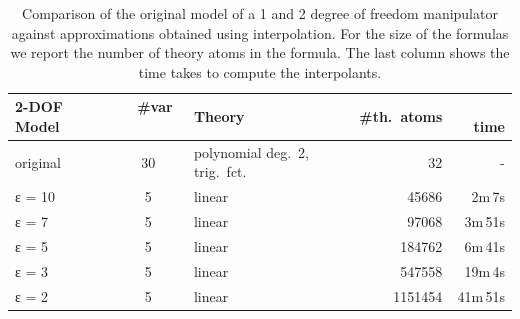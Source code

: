 \begin{example}
\begin{table}
\vspace{2ex}

\begin{tabular}{l|clrr}
2-DOF Model    & ~ \#var  ~~ & Theory   & \#th.~atoms & ~~ time \\
\hline
original & 30 & polynomial deg.~2, trig.~fct.   & 32        & - \\
ε = 10   & 5  & linear                          & 45686     & 2m\,7s \\
ε = 7    & 5  & linear                          & 97068     & 3m\,51s  \\
ε = 5    & 5  & linear                          & 184762    & 6m\,41s  \\
ε = 3    & 5  & linear                          & 547558    & 19m\,4s  \\
ε = 2    & 5  & linear                          & 1151454   & 41m\,51s  \\
\end{tabular}

\vspace{1ex}

\caption{
    Comparison of the original model of a 1 and 2 degree of freedom manipulator against approximations obtained using interpolation.
    For the size of the formulas we report the number of theory atoms in the formula.
    The last column shows the time \dReal takes to compute the interpolants.
}
\label{tbl:robot}
\end{table}


\end{example}





